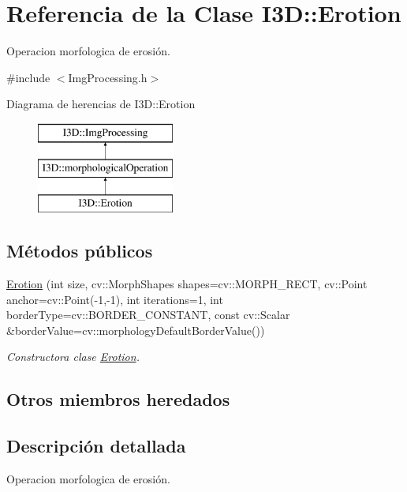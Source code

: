 \hypertarget{class_i3_d_1_1_erotion}{}\section{Referencia de la Clase I3D\+:\+:Erotion}
\label{class_i3_d_1_1_erotion}


Operacion morfologica de erosión.  




{\ttfamily \#include $<$Img\+Processing.\+h$>$}

Diagrama de herencias de I3D\+:\+:Erotion\begin{figure}[H]
\begin{center}
\leavevmode
\includegraphics[height=3.000000cm]{class_i3_d_1_1_erotion}
\end{center}
\end{figure}
\subsection*{Métodos públicos}
\begin{DoxyCompactItemize}
\item 
\hyperlink{class_i3_d_1_1_erotion_a522346abdebbcf2d634aac7d9375ecce}{Erotion} (int size, cv\+::\+Morph\+Shapes shapes=cv\+::\+M\+O\+R\+P\+H\+\_\+\+R\+E\+CT, cv\+::\+Point anchor=cv\+::\+Point(-\/1,-\/1), int iterations=1, int border\+Type=cv\+::\+B\+O\+R\+D\+E\+R\+\_\+\+C\+O\+N\+S\+T\+A\+NT, const cv\+::\+Scalar \&border\+Value=cv\+::morphology\+Default\+Border\+Value())
\begin{DoxyCompactList}\small\item\em Constructora clase \hyperlink{class_i3_d_1_1_erotion}{Erotion}. \end{DoxyCompactList}\end{DoxyCompactItemize}
\subsection*{Otros miembros heredados}


\subsection{Descripción detallada}
Operacion morfologica de erosión. 


